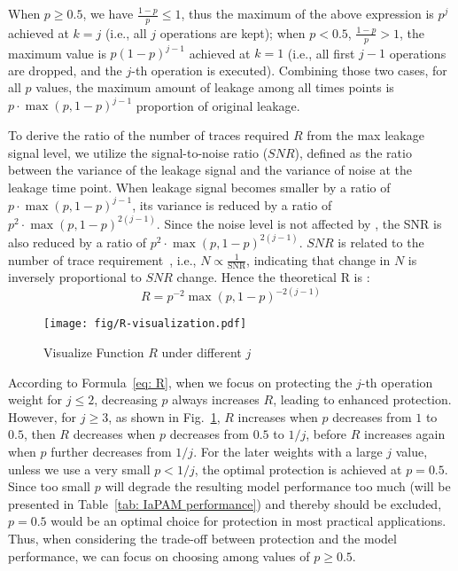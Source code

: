 When $p \ge 0.5$, we have $\frac{1-p}{p} \le 1$, thus the maximum of the above expression is $p^j$ achieved at $k=j$ (i.e., all $j$ operations are kept); when $p<0.5$, $\frac{1-p}{p} > 1$, the maximum value is $p(1-p)^{j-1}$ achieved at $k=1$ (i.e., all first $j-1$ operations are dropped, and the $j$-th operation is executed). 
Combining those two cases, for all $p$ values, the maximum amount of leakage among all times points is $p \cdot \max(p,1-p)^{j-1}$ proportion of original leakage. 

To derive the ratio of the number of traces required $R$ from the max leakage signal level, we utilize the signal-to-noise ratio ($SNR$), defined as the ratio between the variance of the leakage signal and the variance of noise at the leakage time point. 
When leakage signal becomes smaller by a ratio of $p \cdot \max(p,1-p)^{j-1} $, its variance is reduced by a ratio of $p^2 \cdot \max(p,1-p)^{2(j-1)}$. 
Since the noise level is not affected by \method, the SNR is also reduced by a ratio of $p^2 \cdot \max(p,1-p)^{2(j-1)}$. 
$SNR$ is related to the number of trace requirement~\cite{mangard2008power}, i.e., $N \propto \frac{1}{\mathrm{SNR}}$, indicating that change in $N$ is inversely proportional to $SNR$ change.
Hence the theoretical R is :
\begin{equation}
    \label{eq: R}
    R=p^{-2}\max(p,1-p)^{-2(j-1)}
\end{equation}





\begin{figure}[t]
    \centering
    \texttt{[image: fig/R-visualization.pdf]}
    \caption{Visualize Function $R$ under different $j$}
    \label{fig: visualize R}
\end{figure}

According to Formula~\eqref{eq: R}, when we focus on protecting the $j$-th operation weight for $j\le 2$, decreasing $p$ always increases $R$, leading to enhanced protection. However, for $j \ge 3 $, as shown in Fig.~\ref{fig: visualize R}, $R$ increases when $p$ decreases from $1$ to $0.5$, then $R$ decreases when $p$ decreases from $0.5$ to $1/j$, before $R$ increases again when $p$ further decreases from $1/j$. For the later weights with a large $j$ value, unless we use a very small $p<1/j$, the optimal protection is achieved at $p=0.5$. Since too small $p$ will degrade the resulting model performance too much (will be presented in Table~\ref{tab: IaPAM performance}) and thereby should be excluded, $p=0.5$ would be an optimal choice for protection in most practical applications. Thus, when considering the trade-off between protection and the model performance, we can focus on choosing among values of $p \ge 0.5$.

